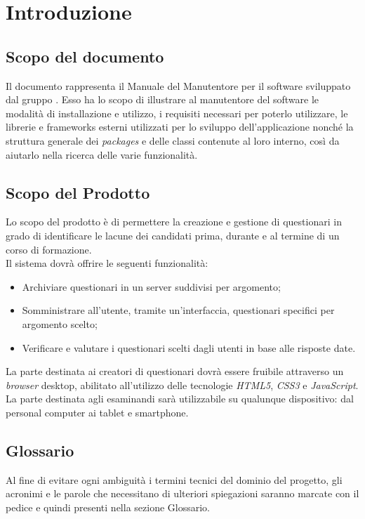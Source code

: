 \newpage
\section{Introduzione}
\subsection{Scopo del documento}
Il documento rappresenta il Manuale del Manutentore per il software \progetto{} sviluppato dal gruppo \gruppo. Esso ha lo scopo di illustrare al manutentore del software le modalità di installazione e utilizzo, i requisiti necessari per poterlo utilizzare, le librerie e frameworks esterni utilizzati per lo sviluppo dell'applicazione nonché la struttura generale dei \textit{packages} e delle classi contenute al loro interno, così da aiutarlo nella ricerca delle varie funzionalità. 
\subsection{Scopo del Prodotto}
Lo scopo del prodotto è di permettere la creazione e gestione di questionari in grado di identificare le lacune dei candidati prima, durante e al termine di un corso di formazione. 
\\Il sistema dovrà offrire le seguenti funzionalità:
\begin{itemize}
	\item
	Archiviare questionari in un server suddivisi per argomento;
	\item
	Somministrare all'utente, tramite un'interfaccia, questionari specifici per argomento scelto;
	\item
	Verificare e valutare i questionari scelti dagli utenti in base alle risposte date.
\end{itemize}
La parte destinata ai creatori di questionari dovrà essere fruibile attraverso un \textit{browser} desktop, abilitato all'utilizzo delle tecnologie \textit{HTML5}, \textit{CSS3} e \textit{JavaScript}. La parte destinata agli esaminandi sarà utilizzabile su qualunque dispositivo: dal personal computer ai tablet e smartphone.
\subsection{Glossario}
Al fine di evitare ogni ambiguità i termini tecnici del dominio del progetto, gli acronimi e le parole che necessitano di ulteriori spiegazioni saranno marcate con il pedice  e quindi presenti nella sezione Glossario.
